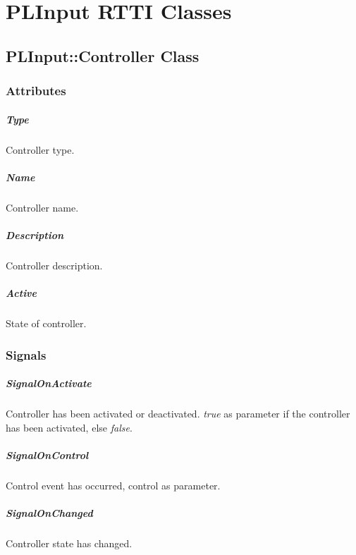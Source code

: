 \chapter{PLInput \ac{RTTI} Classes}




\section{PLInput::Controller Class}


\subsection{Attributes}

\paragraph{Type}
Controller type.

\paragraph{Name}
Controller name.

\paragraph{Description}
Controller description.

\paragraph{Active}
State of controller.


\subsection{Signals}

\paragraph{SignalOnActivate}
Controller has been activated or deactivated. \emph{true} as parameter if the controller has been activated, else \emph{false}.

\paragraph{SignalOnControl}
Control event has occurred, control as parameter.

\paragraph{SignalOnChanged}
Controller state has changed.




